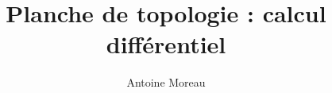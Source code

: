 \documentclass[a4paper,10pt]{article}
\title{Planche de topologie : calcul diff\'erentiel}
\author{Antoine Moreau}
\begin{document}
\maketitle

\begin{abstract}

\end{abstract}



\end{document}
